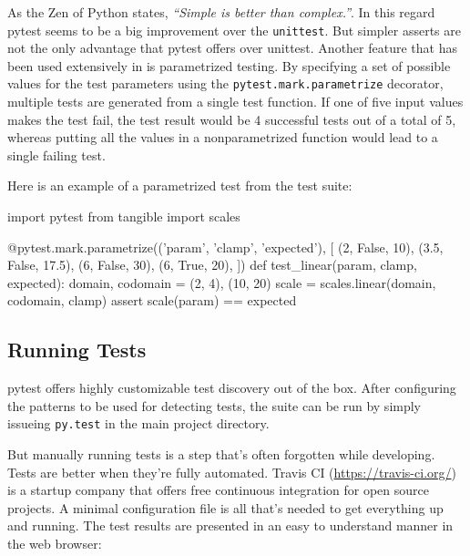 As the Zen of Python \cite{pep20:2004} states, \emph{``Simple is better than
complex.''}. In this regard pytest seems to be a big improvement over the
\texttt{unittest}. But simpler asserts are not the only advantage that pytest
offers over unittest.  Another feature that has been used extensively in
\tangible{} is parametrized testing. By specifying a set of possible values for
the test parameters using the \texttt{pytest.mark.parametrize} decorator,
multiple tests are generated from a single test function. If one of five input
values makes the test fail, the test result would be 4 successful tests out of a
total of 5, whereas putting all the values in a nonparametrized function would
lead to a single failing test.

Here is an example of a parametrized test from the \tangible{} test suite:

\vspace{.5\baselineskip}
\begin{pythoncode}
import pytest
from tangible import scales

@pytest.mark.parametrize(('param', 'clamp', 'expected'), [
    (2, False, 10),
    (3.5, False, 17.5),
    (6, False, 30),
    (6, True, 20),
])
def test_linear(param, clamp, expected):
    domain, codomain = (2, 4), (10, 20)
    scale = scales.linear(domain, codomain, clamp)
    assert scale(param) == expected
\end{pythoncode}


\subsection{Running Tests}

pytest offers highly customizable test discovery out of the box. After
configuring the patterns to be used for detecting tests, the suite can be run
by simply issueing \texttt{py.test} in the main project directory.

But manually running tests is a step that's often forgotten while developing.
Tests are better when they're fully automated. Travis CI
(\url{https://travis-ci.org/}) is a startup company that offers free continuous
integration for open source projects. A minimal configuration file is all that's
needed to get everything up and running. The test results are presented in an
easy to understand manner in the web browser:


